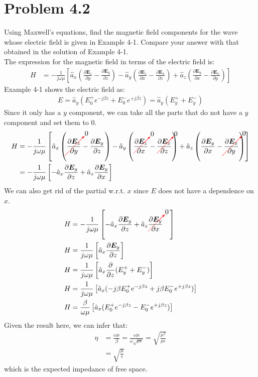 \documentclass[12pt]{article}
\newcommand{\delCross}[1]{
  \left[\hat a_x\left(\frac{\partial\bm{#1}_z}{\partial y} - \frac{\partial\bm{#1}_y}{\partial z}\right) - \hat a_y\left( \frac{\partial\bm{#1}_z}{\partial x} - \frac{\partial\bm{#1}_x}{\partial z}  \right) + \hat a_z\left( \frac{\partial\bm{#1}_y}{\partial x} -  \frac{\partial\bm{#1}_x}{\partial y}\right)\right]
}
\begin{document}
\section*{Problem 4.2}
Using Maxwell’s equations, find the magnetic field components for the wave whose electric field is given in Example 4-1. Compare your answer with that obtained in the solution of Example 4-1.\\
The expression for the magnetic field in terms of the electric field is:
\begin{align*}
  H &= -\frac{1}{j\omega\mu}\delCross{E}
\end{align*}
Example 4-1 shows the electric field as:
\begin{align*}
  E = \hat a_y(E_0^+e^{-j\beta z} + E_0^-e^{+j\beta z}) = \hat a_y(E_y^+ + E_y^-)
\end{align*}
Since it only has a $y$ component, we can take all the parts that do not have a $y$ component and set them to 0.
\begin{align*}
 H &= -\frac{1}{j\omega\mu} \left[\hat a_x\left(\textcolor{red}{\cancelto{\textcolor{black}{0}}{\textcolor{black}{\frac{\partial\bm{E}_z}{\partial y}}}} - \frac{\partial\bm{E}_y}{\partial z}\right) - \hat a_y\left( \textcolor{red}{\cancelto{\textcolor{black}{0}}{\textcolor{black}{\frac{\partial\bm{E}_z}{\partial x}}}} - \textcolor{red}{\cancelto{\textcolor{black}{0}}{\textcolor{black}{\frac{\partial\bm{E}_x}{\partial z}}}}  \right) + \hat a_z\left( \frac{\partial\bm{E}_y}{\partial x} -  \textcolor{red}{\cancelto{\textcolor{black}{0}}{\textcolor{black}{\frac{\partial\bm{E}_x}{\partial y}}}}\right)\right]\\
  &= -\frac{1}{j\omega\mu}  \left[-\hat a_x\frac{\partial\bm{E}_y}{\partial z} + \hat a_z\frac{\partial\bm{E}_y}{\partial x}\right]
\end{align*}
We can also get rid of the partial w.r.t. $x$ since $E$ does not have a dependence on $x$.
\begin{align*}
  H &= -\frac{1}{j\omega\mu}  \left[-\hat a_x\frac{\partial\bm{E}_y}{\partial z} + \hat a_z\textcolor{red}{\cancelto{\textcolor{black}{0}}{\textcolor{black}{\frac{\partial\bm{E}_y}{\partial x}}}}\ \ \ \right]\\
  H &= \frac{1}{j\omega\mu}  \left[\hat a_x\frac{\partial\bm{E}_y}{\partial z} \right]\\
  H &= \frac{1}{j\omega\mu}  \left[\hat a_x\frac{\partial}{\partial z}(E_y^+ + E_y^-) \right]\\
  H &= \frac{1}{j\omega\mu}  \left[\hat a_x(-j\beta E_0^+e^{-j\beta z} + j\beta E_0^-e^{+j\beta z}) \right]\\
  H &= \frac{\beta}{\omega\mu}  \left[\hat a_x(E_0^+e^{-j\beta z} - E_0^-e^{+j\beta z}) \right]
\end{align*}
Given the result here, we can infer that:
\begin{align*}
  \eta &= \frac{\omega \mu}{\beta} = \frac{\omega \mu}{\omega \sqrt{\mu\epsilon}} = \sqrt{\frac{\mu^2}{\mu\epsilon}}\\
  &= \sqrt{\frac{\mu}{\epsilon}}  
\end{align*}
which is the expected impedance of free space. 
\end{document}
